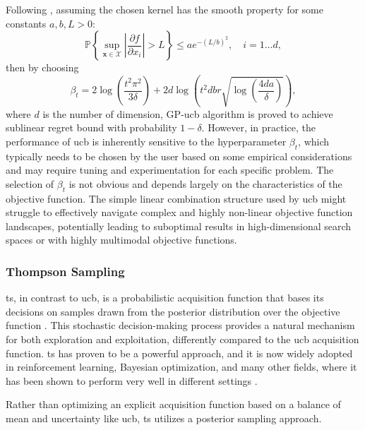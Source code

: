 Following \citep{srinivas2009gaussian}, assuming the chosen
kernel has the smooth property for some constants $a, b, L > 0$:
\[
\mathbb{P} \left\{ \sup_{\mathbf{x} \in \mathcal{X}} \left \vert \frac{\partial f}{\partial x_i} \right \vert > L \right\} \leq a e^{-(L/b)^2}, \quad i=1 \ldots d, 
\]
then by choosing
\[
\beta_t = 2 \log \left( \frac{t^2 \pi^2}{3\delta} \right) + 2d \log \left( t^2 dbr \sqrt{\log \left( \frac{4da}{\delta} \right) } \right),
\]
where $d$ is the number of dimension, GP-\ac{ucb} algorithm is proved to achieve sublinear regret bound with probability $1 - \delta$. However, in practice, the performance of \ac{ucb} is inherently sensitive to the hyperparameter \(\beta_t\), which typically needs to be chosen by the user based on some empirical considerations and may require tuning and experimentation for each specific problem. The selection of \(\beta_t\) is not obvious and depends largely on the characteristics of the objective function. 
The simple linear combination structure used by \ac{ucb} might struggle to effectively navigate complex and highly non-linear objective function landscapes, potentially leading to suboptimal results in high-dimensional search spaces or with highly multimodal objective functions.

\subsubsection{Thompson Sampling}
\label{section:thompson_sampling}

\acf{ts}, in contrast to \ac{ucb}, is a probabilistic acquisition function that bases its decisions on samples drawn from the posterior distribution over the objective function \citep{thompson1933likelihood, russo2018tutorial}. This stochastic decision-making process provides a natural mechanism for both exploration and exploitation, differently compared to the \ac{ucb} acquisition function. \ac{ts} has proven to be a powerful approach, and it is now widely adopted in reinforcement learning, Bayesian optimization, and many other fields, where it has been shown to perform very well in different settings \citep{agrawal2017thompson, chowdhury2017kernelized}.

Rather than optimizing an explicit acquisition function based on a balance of mean and uncertainty like \ac{ucb}, \ac{ts} utilizes a posterior sampling approach. 

